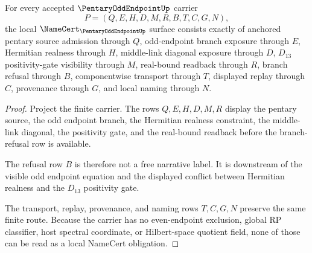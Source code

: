 \begin{theorem}
\label{thm:pentary-odd-endpoint-namecert-obligations}
For every accepted $\PentaryOddEndpointUp$ carrier
$$
P=(Q,E,H,D,M,R,B,T,C,G,N),
$$
the local $\NameCert_{\PentaryOddEndpointUp}$ surface consists exactly of anchored pentary source admission through $Q$, odd-endpoint branch exposure through $E$, Hermitian realness through $H$, middle-link diagonal exposure through $D$, $D_{13}$ positivity-gate visibility through $M$, real-bound readback through $R$, branch refusal through $B$, componentwise transport through $T$, displayed replay through $C$, provenance through $G$, and local naming through $N$.
\end{theorem}
\begin{proof}
Project the finite carrier. The rows $Q,E,H,D,M,R$ display the pentary source, the odd endpoint branch, the Hermitian realness constraint, the middle-link diagonal, the positivity gate, and the real-bound readback before the branch-refusal row is available.

The refusal row $B$ is therefore not a free narrative label. It is downstream of the visible odd endpoint equation and the displayed conflict between Hermitian realness and the $D_{13}$ positivity gate.

The transport, replay, provenance, and naming rows $T,C,G,N$ preserve the same finite route. Because the carrier has no even-endpoint exclusion, global RP classifier, host spectral coordinate, or Hilbert-space quotient field, none of those can be read as a local NameCert obligation.
\end{proof}





